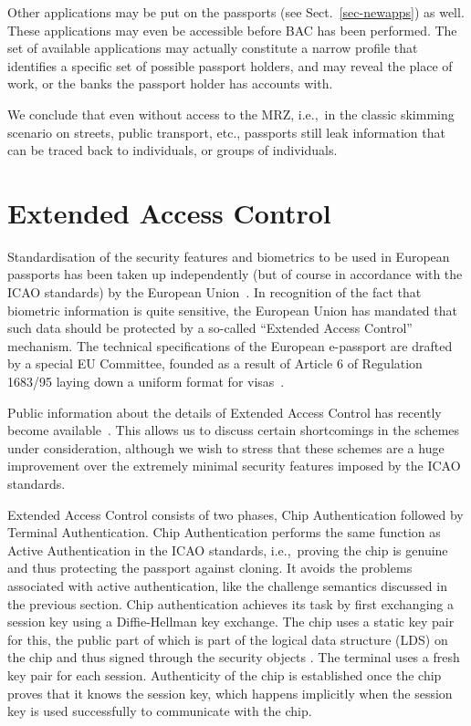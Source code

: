 \documentclass[runningheads,envcountsame,envcountsect,oribibl]{llncs}
\newcommand{\ie}{{i.e.},\ }		\newcommand{\eg}{{e.g.},\ }		\newcommand{\etal}{\textit{et al.}~}
\begin{document}
Other applications may be put on the passports (see 
Sect.~\ref{sec-newapps}) as well.
These applications may even be accessible before BAC has been performed.
The set of available applications may actually constitute a narrow profile that
identifies a specific set of possible passport holders,
and may reveal the place of work, or the banks the passport
holder has accounts with.

We conclude that even without access to the MRZ, \ie in the classic skimming
scenario on streets, public transport, etc.,
passports still leak information that can be traced back to individuals,
or groups of individuals.  



\section{Extended Access Control}
\label{sec-eac}

Standardisation of the security features and biometrics to be used in European
passports has been taken up independently (but of course in accordance with the
ICAO standards) by the European Union~\cite{COM(2004)0116}.
In recognition of the fact that biometric information is quite sensitive, the 
European Union has mandated that such data should be protected by a so-called
``Extended Access Control'' mechanism.
The technical specifications of the European e-passport are drafted by a
special EU Committee, founded as a result of
Article 6 of Regulation 1683/95 laying down a uniform
format for visas~\cite{COM(2001)577}.

Public information about the details of Extended Access Control 
has recently become
available~\cite{bsi2006extendedaccesscontrol,kuegler2005eac}. 
This allows us to discuss
certain shortcomings in the schemes under consideration, although we wish to
stress that these schemes are a huge improvement over the extremely minimal
security features imposed by the ICAO standards.

Extended Access Control consists of two phases, Chip Authentication followed
by Terminal Authentication. 
Chip Authentication performs the same function as
Active Authentication in the ICAO standards, \ie proving the chip is genuine
and thus protecting the passport against cloning. It avoids the problems
associated with active authentication, like the challenge semantics discussed
in the previous section. Chip authentication achieves its task by 
first exchanging a session key using a Diffie-Hellman key exchange.
The chip uses a static key pair for this, the public part of which is part of the
logical data structure (LDS) on the chip
and thus signed through the security objects . The terminal uses a fresh
key pair for each session. Authenticity of the chip is established once
the chip proves that it knows the session key, which happens implicitly
when the session key is used successfully to communicate with the chip.
\end{document}
